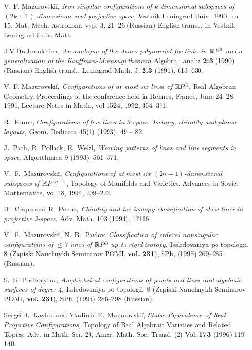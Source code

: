 \documentclass{article}
\begin{document}
\begin{thebibliography}{9999999}
V. F. Mazurovski\u{i}, {\it Non-singular configurations of 
$k$-dimensional subspaces of $(2k+1)$-dimensional real projective 
space}, Vestnik Leningrad Univ. 1990, no. 15, Mat. Mech. Astronom. 
vyp. 3, 21--26 (Russian) English transl., in Vestnik Leningrad Univ. 
Math.

J.V.Drobotukhina, {\it An analogue of the Jones polynomial for links in 
$\mathbb{R} P^3$
and a generalization of the Kauffman-Murasugi theorem}
Algebra i analiz
{\bf 2:3} (1990) (Russian) English transl.,
Leningrad Math. J. {\bf 2:3} (1991), 613--630.


V. F. Mazurovski\u{i}, {\it Configurations of at most six lines of $\mathbb{R} 
P^3$}, Real Algebraic Geometry, Proceedings of the conference held in
Rennes, France, June 24--28, 1991, Lecture Notes in Math., vol 1524,
1992, 354--371.

  R.\ Penne, {\em Configurations of few lines in 3-space. Isotopy, chirality and planar layouts,\/} Geom. Dedicata 45(1) (1993), 49 -- 82. 

 J.\ Pach, R.\ Pollack, E.\ Welzl, {\em Weaving patterns of lines and line segments in space\/}, Algorithmica 9 (1993), 561--571.

 V.\ F.\ Mazurovski\u{i}, {\it Configurations of at most six $(2n-1)$-dimensional subspaces  of $\mathbb{R} 
P^{4n-1}$}, Topology of Manifolds and Varieties, Advances in Soviet Mathematics, vol 18, 1994, 209--222.  

 H.\ Crapo and R.\ Penne, {\em Chirality and the isotopy classification of skew lines in projective 3-space,\/} Adv. Math. 103 (1994), 1?106. 

 V.\ F.\ Mazurovski\u{i}, N.\ B.\ Pavlov, {\it Classification of
ordered nonsingular configurations of $\le7$ lines of $\mathbb{R} P^3$ up to
rigid isotopy,} Issledovaniya po topologii.  8 (Zapiski Nauchnykh
Seminarov POMI, {\bf vol. 231}), SPb, (1995) 269--285 (Russian).

 S.\ S.\ Podkorytov, {\em Amphicheiral configurations of
points and lines and algebraic surfaces of degree 4,} Issledovaniya po 
topologii.  8 (Zapiski Nauchnykh Seminarov POMI, {\bf vol. 231}), SPb, 
(1995) 286--298 (Russian).

 Serge\u\i \ I.\ Kashin and Vladimir F.\ Mazurovski\u{i},   
{\em Stable Equivalence of Real Projective Configurations,} Topology of
Real Algebraic Varieties and Related Topics, Adv. in Math. Sci. 29, 
Amer. Math. Soc. Transl. (2) Vol. {\bf173} (1996) 119--140.


\end{thebibliography}
\end{document}
